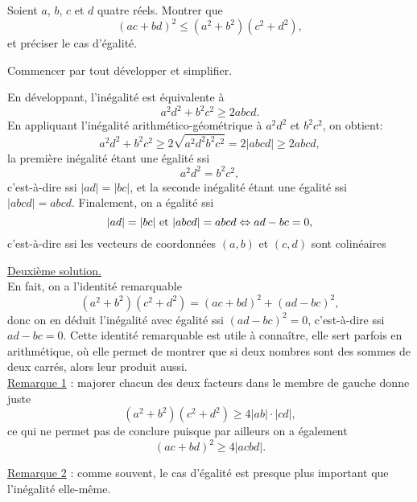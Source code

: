 \begin{exo}
Soient $a$, $b$, $c$ et $d$ quatre réels. Montrer que
\[ (ac+bd)^2 \leq (a^2+b^2)(c^2+d^2),\]
et préciser le cas d'égalité.

\begin{hint}
Commencer par tout développer et simplifier.
\end{hint}
 

\begin{sol} 
En développant, l'inégalité est équivalente à 
\[
a^2d^2+b^2c^2 \geq 2abcd.
\]
En appliquant l'inégalité arithmético-géométrique à $a^2d^2$ et $b^2c^2$, on obtient:
\[
a^2d^2+b^2c^2 \geq 
2\sqrt{a^2d^2b^2c^2}
=2|abcd|
\geq 2abcd,
\]
la première inégalité étant une égalité ssi 
\[ a^2d^2=b^2c^2,\]
c'est-à-dire ssi $|ad|=|bc|$, et la seconde inégalité étant une égalité ssi $|abcd|=abcd$. Finalement, on a égalité ssi
\[ 
|ad|=|bc| \text{ et }  |abcd|=abcd \\
\Leftrightarrow ad-bc=0,
\]
c'est-à-dire ssi les vecteurs de coordonnées $(a,b)$ et $(c,d)$ sont colinéaires

\underline{Deuxième solution.}\\
En fait, on a l'identité remarquable
\[ (a^2+b^2)(c^2+d^2)=  (ac+bd)^2 + (ad-bc)^2,\]
donc on en déduit l'inégalité avec égalité ssi $(ad-bc)^2=0$, c'est-à-dire ssi $ad-bc=0$. Cette identité remarquable est utile à connaître, elle sert parfois en arithmétique, où elle permet de montrer que si deux nombres sont des sommes de deux carrés, alors leur produit aussi.\\


\underline{Remarque 1} : majorer chacun des deux facteurs dans le membre de gauche donne juste 
\[ (a^2+b^2)(c^2+d^2) \geq 4|ab|\cdot|cd|,\]
ce qui ne permet pas de conclure puisque par ailleurs on a également 
\[ (ac+bd)^2 \geq 4|acbd|.\]

\underline{Remarque 2} : comme souvent, le cas d'égalité est presque plus important que l'inégalité elle-même.

\end{sol}  
\end{exo}





